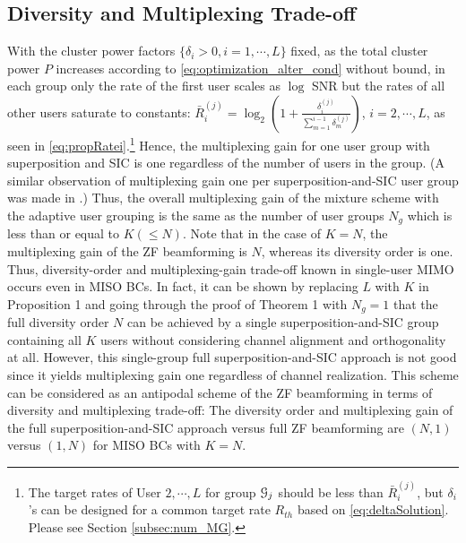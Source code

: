 \documentclass[11pt, draft, onecolumn ]{IEEEtran}
\begin{document}
\subsection{Diversity and Multiplexing Trade-off}





With the cluster power factors $\{\delta_i > 0,i=1,\cdots,L\}$ fixed, as the total cluster power $P$ increases according to \eqref{eq:optimization_alter_cond} without bound,
 in each group only the rate of the first user scales as $\log$ SNR but the rates of all other users saturate to constants:
$\bar{R}_i^{(j)} = \log_2 \left( 1+ \frac{\delta_i^{(j)}}{\sum_{m=1}^{i-1}\delta_m^{(j)}} \right)$, $i=2,\cdots,L$, as seen in  \eqref{eq:propRatei}.\footnote{The target rates of User $2,\cdots, L$ for group ${\cal G}_j$ should be less than $\bar{R}_i^{(j)}$,  but $\delta_i$'s can be designed for a common target rate $R_{th}$ based on  \eqref{eq:deltaSolution}. Please see Section \ref{subsec:num_MG}.}
Hence, the multiplexing gain for one user group with superposition and SIC is one regardless of the number of users in the group. (A similar observation of multiplexing gain one per superposition-and-SIC user group was made in \cite{DingAdachiPoor16WC2}.)
Thus, the overall multiplexing gain of the mixture scheme with the adaptive user grouping is the same as the number of user groups $N_g$ which is less than or equal to $K(\le N)$. Note that in the case of $K=N$, the multiplexing gain of the ZF beamforming is $N$, whereas its diversity order is one.  Thus, diversity-order and multiplexing-gain trade-off known in single-user MIMO \cite{ZhengTse:03IT} occurs even in MISO BCs\cite{Mroueh08ISIT}.
In fact, it can be shown by replacing $L$ with $K$ in Proposition 1  and going through the proof of Theorem 1  with $N_g=1$ that the full diversity order  $N$ can be achieved by a single superposition-and-SIC group  containing all $K$ users without considering channel alignment and orthogonality at all. However, this single-group full superposition-and-SIC approach is not good since it  yields multiplexing gain one regardless of channel realization. This scheme can be considered as an antipodal scheme of the ZF beamforming in terms of diversity and multiplexing trade-off: The diversity order and multiplexing gain of the full superposition-and-SIC approach versus full ZF beamforming  are $(N,1)$ versus $(1,N)$ for MISO BCs with $K=N$.
\end{document}
